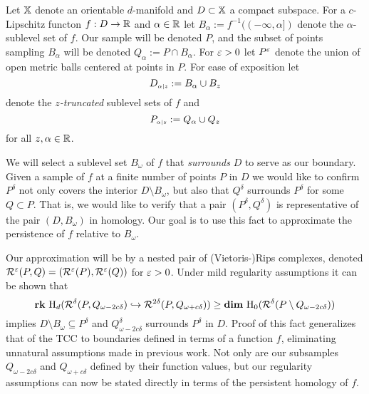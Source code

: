 
Let $\mathbb{X}$ denote an orientable $d$-manifold and $D\subset\mathbb{X}$ a compact subspace.
For a $c$-Lipschitz functon $f : D\to \mathbb{R}$ and $\alpha\in\mathbb{R}$ let $B_\alpha := f^{-1}((-\infty,\alpha])$ denote the $\alpha$-sublevel set of $f$.
Our sample will be denoted $P$, and the subset of points sampling $B_\alpha$ will be denoted $Q_\alpha := P\cap B_\alpha$.
For $\varepsilon > 0$ let $P^\varepsilon$ denote the union of open metric balls centered at points in $P$.
For ease of exposition let
\[ D_{\scriptscriptstyle \alpha\mid z} := B_\alpha\cup B_z \]
denote the \emph{$z$-truncated} sublevel sets of $f$ and %
\[ P_{\scriptscriptstyle \alpha\mid z} := Q_\alpha\cup Q_z\]
for all $z,\alpha\in\mathbb{R}$.

We will select a sublevel set $B_\omega$ of $f$ that \emph{surrounds} $D$ to serve as our boundary.
Given a sample of $f$ at a finite number of points $P$ in $D$ we would like to confirm $P^\delta$ not only covers the interior $D\setminus B_\omega$, but also that $Q^\delta$ surrounds $P^\delta$ for some $Q\subset P$.
That is, we would like to verify that a pair $(P^\delta, Q^\delta)$ is representative of the pair $(D,B_\omega)$ in homology.
Our goal is to use this fact to approximate the persistence of $f$ relative to $B_\omega$.

Our approximation will be by a nested pair of (Vietoris-)Rips complexes, denoted $\mathcal{R}^\varepsilon(P, Q) = (\mathcal{R}^\varepsilon(P), \mathcal{R}^\varepsilon(Q))$ for $\varepsilon > 0$.
Under mild regularity assumptions it can be shown that
\[ \mathbf{rk}~\mathrm{H}_d(\mathcal{R}^\delta(P, Q_{\omega - 2c\delta})\hookrightarrow \mathcal{R}^{2\delta}(P, Q_{\omega+c\delta}))\geq \mathbf{dim}~\mathrm{H}_0(\mathcal{R}^\delta(P\setminus Q_{\omega-2c\delta}))\]
implies $D\setminus B_\omega\subseteq P^\delta$ and $Q_{\omega-2c\delta}^\delta$ surrounds $P^\delta$ in $D$.
Proof of this fact generalizes that of the TCC to boundaries defined in terms of a function $f$, eliminating unnatural assumptions made in previous work.
Not only are our subsamples $Q_{\omega-2c\delta}$ and $Q_{\omega+c\delta}$ defined by their function values, but our regularity assumptions can now be stated directly in terms of the persistent homology of $f$.

